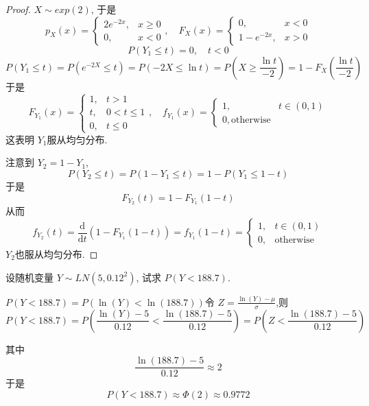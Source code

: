 \documentclass[../main.tex]{subfiles}
\begin{document}
\begin{proof}
  \(  X\sim exp\left( 2 \right)   \), 于是 \[
  p_{X}\left( x \right)= \begin{cases}  2e^{- 2 x},&x\ge 0\\ 
   0,&x< 0 \end{cases}  ,\quad F_{X}\left( x \right)= \begin{cases} 0,&x< 0\\ 
    1-e^{-2x},&x> 0 \end{cases}  
  \] \[
  P\left( Y_1\le t \right)= 0,\quad t< 0 
  \]   \[
  P\left( Y_1\le t \right)= P\left( e^{-2X}\le t \right)= P\left( -2X\le \ln t \right)= P\left( X\ge \frac{\ln t }{-2 }  \right)  = 1- F_{X}\left( \frac{\ln t }{-2 }  \right)   
  \]于是 \[
  F_{Y_1}\left( x \right)= \begin{cases} 1,&t> 1\\ 
 t,&0< t\le 1\\ 
  0,&t\le 0 \end{cases}  ,\quad f_{Y_1}\left( x \right) = \begin{cases} 1,& t\in \left( 0,1 \right)\\ 
   0, \text{otherwise}  \end{cases} 
  \]这表明 \(  Y_1  \)服从均匀分布. 
  
  注意到 \(  Y_2= 1-Y_1  \),  \[
  P\left( Y_2\le t \right)= P\left( 1-Y_1\le t \right)= 1-P\left( Y_1\le 1-t \right)   
  \] 于是 \[
  F_{Y_2}\left( t \right)= 1-F_{Y_1}\left( 1-t \right)  
  \]从而 \[
  f_{Y_2}\left( t \right)= \frac{\mathrm{d}}{\mathrm{d}t}\left( 1-F_{Y_1}\left( 1-t \right)  \right)=  f_{Y_1}\left( 1-t \right) = \begin{cases} 1,&t\in \left( 0,1 \right)\\ 
   0,&\text{otherwise}  \end{cases}   
  \]\(  Y_2  \)也服从均匀分布. 
\end{proof}
\begin{exercise}{}{}
设随机变量 $Y \sim LN(5, 0.12^2)$, 试求 $P(Y < 188.7)$.
\end{exercise}
\begin{solution}
  $P(Y < 188.7) = P(\ln(Y) < \ln(188.7))$令 $Z = \frac{\ln(Y) - \mu}{\sigma}$,则 $$P(Y < 188.7) = P\left(\frac{\ln(Y) - 5}{0.12} < \frac{\ln(188.7) - 5}{0.12}\right) = P\left(Z < \frac{\ln(188.7) - 5}{0.12}\right)$$
\end{solution}
其中 \[
\frac{\ln(188.7) - 5}{0.12} \approx 2
\]于是 \[
P(Y < 188.7) \approx \Phi \left( 2 \right)  \approx 0.9772
\]
\end{document}

